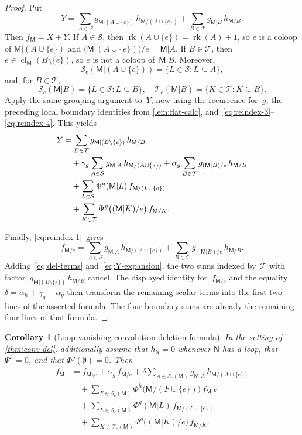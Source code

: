 \documentclass[12pt,letterpaper,english]{amsart}
\theoremstyle{teoremas}
\newtheorem{corollary}[theorem]{Corollary}
\theoremstyle{definition}
\DeclareMathOperator{\rk}{rk}
\DeclareMathOperator{\cl}{cl}
\newcommand{\M}{\mathsf{M}}
\newcommand{\N}{\mathsf{N}}
\newcommand{\Se}{\mathcal{S}_e}
\newcommand{\Te}{\mathcal{T}_e}
\begin{document}
\begin{proof}
Put
\[
Y = \sum_{A \in \mathcal{S}} g_{\M|(A \cup \{e\})}\, h_{\M/(A \cup \{e\})}
  + \sum_{B \in \mathcal{T}} g_{\M|B}\, h_{\M/B}.
\]
Then $f_{\M} = X + Y$.
If $A \in \mathcal{S}$, then $\rk(A \cup \{e\}) = \rk(A) + 1$, so $e$ is
a coloop of $\M|(A \cup \{e\})$ and $(\M|(A \cup \{e\}))/e = \M|A$.
If $B \in \mathcal{T}$, then $e \in \cl_{\M}(B \setminus \{e\})$, so $e$
is not a coloop of~$\M|B$.  Moreover,
\[
\Se(\M|(A \cup \{e\})) = \{L \in \mathcal{S} : L \subseteq A\},
\]
and, for $B \in \mathcal{T}$,
\[
\Se(\M|B) = \{L \in \mathcal{S} : L \subseteq B\},\quad
\Te(\M|B) = \{K \in \mathcal{T} : K \subseteq B\}.
\]
Apply the same grouping argument to~$Y$, now using the recurrence for~$g$,
the preceding local boundary identities from \cref{lem:flat-calc},
and~\eqref{eq:reindex-3}--\eqref{eq:reindex-4}.  This yields
\begin{align}
Y &= \sum_{B \in \mathcal{T}} g_{\M|(B \setminus \{e\})}\, h_{\M/B}
  \notag \\
&\quad + \gamma_g \sum_{A \in \mathcal{S}} g_{\M|A}\, h_{\M/(A \cup \{e\})}
  + \alpha_g \sum_{B \in \mathcal{T}} g_{(\M|B)/e}\, h_{\M/B}
  \notag \\
&\quad + \sum_{L \in \mathcal{S}} \Phi^g(\M|L)\, f_{\M/(L \cup \{e\})}
  \notag \\
&\quad + \sum_{K \in \mathcal{T}}
  \Psi^g\bigl((\M|K)/e\bigr)\, f_{\M/K}.
  \label{eq:Y-expansion}
\end{align}

Finally, \eqref{eq:reindex-1}~gives
\[
f_{\M/e} = \sum_{A \in \mathcal{S}} g_{\M|A}\, h_{\M/(A \cup \{e\})}
  + \sum_{B \in \mathcal{T}} g_{(\M|B)/e}\, h_{\M/B}.
\]
Adding~\eqref{eq:del-terms} and~\eqref{eq:Y-expansion}, the two sums
indexed by~$\mathcal{T}$ with factor~$g_{\M|(B \setminus \{e\})}\, h_{\M/B}$
cancel.  The displayed identity for~$f_{\M/e}$ and the equality
$\delta = \alpha_h + \gamma_g - \alpha_g$ then transform the remaining
scalar terms into the first two lines of the asserted formula.
The four boundary sums are already the remaining four lines of that formula.
\end{proof}

\begin{corollary}[Loop-vanishing convolution deletion formula]
\label{cor:loop-vanish}
In the setting of \cref{thm:conv-del}, additionally assume that
$h_{\N} = 0$ whenever $\N$ has a loop, that $\Psi^h = 0$,
and that $\Phi^g(\emptyset) = 0$.  Then
\begin{align*}
f_{\M} &= f_{\M \setminus e} + \alpha_g\, f_{\M/e}
  + \delta \sum_{A \in \Se(\M)} g_{\M|A}\, h_{\M/(A \cup \{e\})} \\
&\quad + \sum_{F \in \Se(\M)}
    \Phi^h\bigl(\M/(F \cup \{e\})\bigr)\, f_{\M|F} \\
&\quad + \sum_{L \in \Se(\M)}
    \Phi^g(\M|L)\, f_{\M/(L \cup \{e\})} \\
&\quad + \sum_{K \in \Te(\M)}
    \Psi^g\bigl((\M|K)/e\bigr)\, f_{\M/K}.
\end{align*}
\end{corollary}
\end{document}
